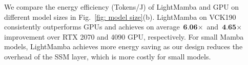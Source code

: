We compare the energy efficiency (Tokens/J) of LightMamba and GPU on different model sizes in Fig.~\ref{fig: model size}(b).
LightMamba on VCK190 consistently outperforms GPUs and achieves on average $\textbf{6.06}\times$ and $\textbf{4.65}\times$ improvement over RTX 2070 and 4090 GPU, respectively.
For small Mamba models, LightMamba achieves more energy saving as our design reduces the overhead of the SSM layer,
which is more costly for small models.




 





